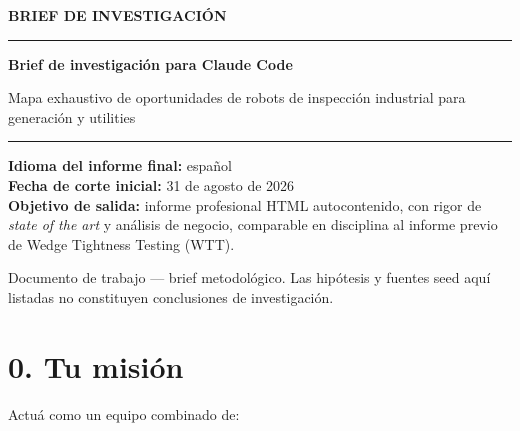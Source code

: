 \documentclass[11pt,a4paper]{article}
\begin{document}

\begin{titlepage}
\thispagestyle{empty}
\setlength{\parindent}{0pt}
\raggedright
\vspace*{3.2cm}
{\sffamily\footnotesize\bfseries\color{accent}%
 \MakeUppercase{Brief de investigación}\par}
\vspace{8pt}
{\color{accent}\rule{\linewidth}{2.5pt}}
\vspace{20pt}

{\sffamily\huge\bfseries Brief de investigación para Claude Code\par}
\vspace{12pt}
{\sffamily\large\color{inksoft} Mapa exhaustivo de oportunidades de robots de inspección industrial para generación y utilities\par}
\vspace{30pt}
{\color{rulegray}\rule{0.35\linewidth}{0.6pt}\par}
\vspace{14pt}
{\normalsize \textbf{Idioma del informe final:} español\\[2pt]
\textbf{Fecha de corte inicial:} 31 de agosto de 2026\\[2pt]
\textbf{Objetivo de salida:} informe profesional HTML autocontenido, con rigor de \emph{state of the art} y análisis de negocio, comparable en disciplina al informe previo de Wedge Tightness Testing (WTT).\par}
\vfill
{\sffamily\footnotesize\color{inksoft}Documento de trabajo --- brief metodológico.
Las hipótesis y fuentes seed aquí listadas no constituyen conclusiones de
investigación.\par}
\end{titlepage}
\setcounter{page}{2}

\tableofcontents
\clearpage
{}


\section*{0. Tu misión}
Actuá como un equipo combinado de:
\end{document}
